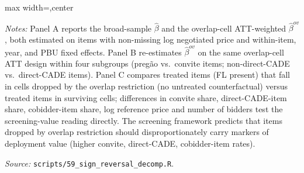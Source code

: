 \begin{table}[htbp]
\begin{adjustbox}{max width=\textwidth,center}
\begin{threeparttable}
\begin{tablenotes}
\footnotesize
\item \textit{Notes:} Panel A reports the broad-sample $\widehat\beta$ and the overlap-cell ATT-weighted $\widehat\beta^{ov}$, both estimated on items with non-missing log negotiated price and within-item, year, and PBU fixed effects. Panel B re-estimates $\widehat\beta^{ov}$ on the same overlap-cell ATT design within four subgroups (pregão vs.\ convite items; non-direct-CADE vs.\ direct-CADE items). Panel C compares treated items (FL present) that fall in cells dropped by the overlap restriction (no untreated counterfactual) versus treated items in surviving cells; differences in convite share, direct-CADE-item share, cobidder-item share, log reference price and number of bidders test the screening-value reading directly. The screening framework predicts that items dropped by overlap restriction should disproportionately carry markers of deployment value (higher convite, direct-CADE, cobidder-item rates).
\item \textit{Source:} \texttt{scripts/59\_sign\_reversal\_decomp.R}.
\end{tablenotes}
\end{threeparttable}
\end{adjustbox}
\end{table}
